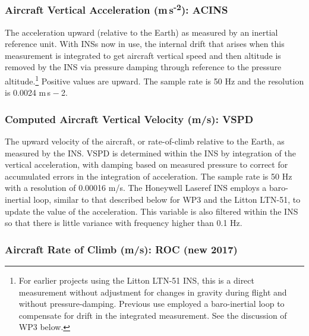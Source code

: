 \documentclass[
  english,
]{book}
\begin{document}
\hypertarget{ACINS}{%
\subsubsection*{\texorpdfstring{Aircraft Vertical Acceleration (m s\textsuperscript{-2}): ACINS}{Aircraft Vertical Acceleration (m s-2): ACINS}}\label{ACINS}}

The acceleration upward (relative to the Earth) as measured by an inertial reference unit. With INSs now in use, the internal drift that arises when this measurement is integrated to get aircraft vertical speed and then altitude is removed by the INS via pressure damping through reference to the pressure altitude.\footnote{For earlier projects using the Litton LTN-51 INS, this is a direct measurement without adjustment for changes in gravity during flight and without pressure-damping. Previous use employed a baro-inertial loop to compensate for drift in the integrated measurement. See the discussion of WP3 below.}
Positive values are upward. The sample rate is 50 Hz and the resolution is 0.0024 m s{ − 2}.

\hypertarget{vspd}{%
\subsubsection*{Computed Aircraft Vertical Velocity (m/s): VSPD}\label{vspd}}

The upward velocity of the aircraft, or rate-of-climb relative to the Earth, as measured by the INS. VSPD is determined within the INS by integration of the vertical acceleration, with damping based on measured pressure to correct for accumulated errors in the integration of acceleration. The sample rate is 50 Hz with a resolution of 0.00016 m/s. The Honeywell Laseref INS employs a baro-inertial loop, similar to that described below for WP3 and the Litton LTN-51, to update the value of the acceleration. This variable is also filtered within the INS so that there is little variance with frequency higher than 0.1 Hz.

\hypertarget{roc}{%
\subsubsection*{Aircraft Rate of Climb (m/s): ROC (new 2017)}\label{roc}}
\end{document}
